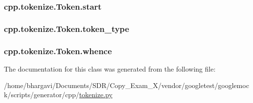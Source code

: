 \subsubsection[{\texorpdfstring{start}{start}}]{\setlength{\rightskip}{0pt plus 5cm}cpp.\+tokenize.\+Token.\+start}\hypertarget{classcpp_1_1tokenize_1_1_token_a8ec48e348ff29901857cb21553da464b}{}\label{classcpp_1_1tokenize_1_1_token_a8ec48e348ff29901857cb21553da464b}
\subsubsection[{\texorpdfstring{token\+\_\+type}{token_type}}]{\setlength{\rightskip}{0pt plus 5cm}cpp.\+tokenize.\+Token.\+token\+\_\+type}\hypertarget{classcpp_1_1tokenize_1_1_token_a60c6e5120f3947885f10788ceb69a660}{}\label{classcpp_1_1tokenize_1_1_token_a60c6e5120f3947885f10788ceb69a660}
\subsubsection[{\texorpdfstring{whence}{whence}}]{\setlength{\rightskip}{0pt plus 5cm}cpp.\+tokenize.\+Token.\+whence}\hypertarget{classcpp_1_1tokenize_1_1_token_a9d3a8011707ede6be85987d74f88848d}{}\label{classcpp_1_1tokenize_1_1_token_a9d3a8011707ede6be85987d74f88848d}


The documentation for this class was generated from the following file\+:\begin{DoxyCompactItemize}
\item 
/home/bhargavi/\+Documents/\+S\+D\+R/\+Copy\+\_\+\+Exam\+\_\+X/vendor/googletest/googlemock/scripts/generator/cpp/\hyperlink{tokenize_8py}{tokenize.\+py}\end{DoxyCompactItemize}
